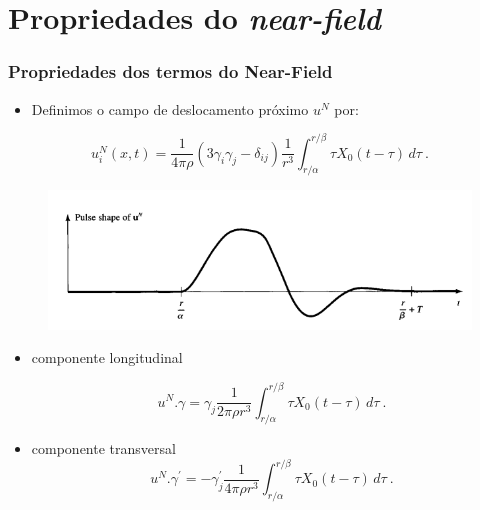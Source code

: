 \documentclass{beamer}
\begin{document}
\section{Propriedades do \textit{near-field}}

\begin{frame}
	
	\frametitle {Propriedades dos termos do Near-Field}
	
	\begin{itemize}
		\item Definimos o campo de deslocamento próximo $u^{N}$ por:
	\end{itemize}
	
	\begin{equation}
	u_{i}^{N}(x,t)= \frac{1}{4\pi\rho}(3\gamma_{i}\gamma_{j}-\delta_{ij})\frac{1}{r^{3}} \int_{r/\alpha}^{r/\beta} \tau X_{0}(t-\tau) \,d\tau\ .
	\end{equation}
	
	\begin{figure}
		\includegraphics[scale=1.5]{fig1.png}
	\end{figure}
	
	
\end{frame}

\begin{frame}
	\begin{itemize}
		\item componente longitudinal
		
		\begin{equation}
		u^{N}.\gamma= \gamma _{j}\frac{1}{2\pi\rho r^{3}}\int_{r/\alpha}^{r/\beta} \tau X_{0}(t-\tau) \,d\tau\ .
		\end{equation}
		
		\item componente transversal
		\begin{equation}
		u^{N}.\gamma^{'}= -\gamma^{'} _{j}\frac{1}{4\pi\rho r^{3}}\int_{r/\alpha}^{r/\beta} \tau X_{0}(t-\tau) \,d\tau\ .
		\end{equation}
	\end{itemize}
	
	
\end{frame}
\end{document}
